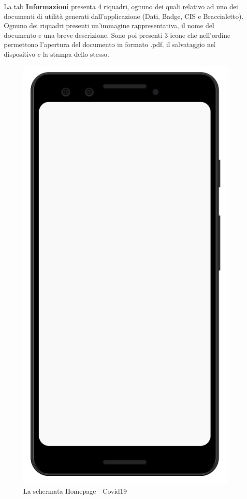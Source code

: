 \documentclass[12pt,a4paper,twoside,openright,titlepage]{book}
\begin{document}
La tab \textbf{Informazioni} presenta 4 riquadri, ognuno dei quali relativo ad uno dei documenti di utilità generati dall'applicazione (Dati, Badge, CIS e Braccialetto). Ognuno dei riquadri presenti un'immagine rappresentativa, il nome del documento e una breve descrizione. Sono poi presenti 3 icone che nell'ordine permettono l'apertura del documento in formato .pdf, il salvataggio nel dispositivo e la stampa dello stesso.

\begin{figure}[H]
\centering
\includegraphics[scale = 0.2]{mobile}
\caption{La schermata Homepage - Covid19}
\end{figure}
\end{document}
